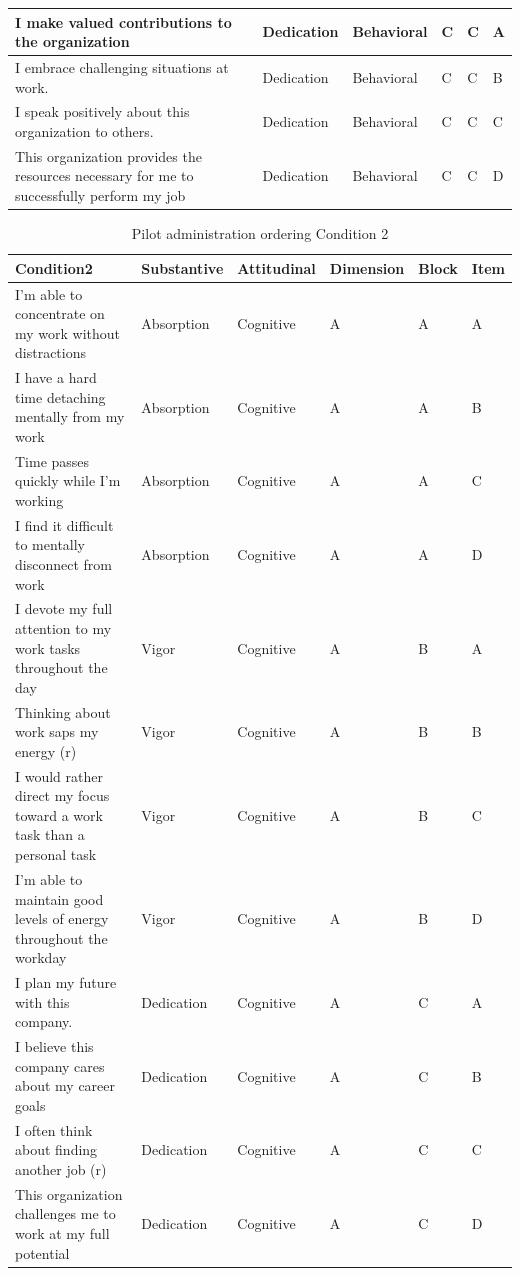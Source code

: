 \documentclass[
]{book}
\begin{document}
\begin{table}
\begin{tabular}[t]{l|l|l|l|l|l}
\hline
I make valued contributions to the organization & Dedication & Behavioral & C & C & A\\
\hline
I embrace challenging situations at work. & Dedication & Behavioral & C & C & B\\
\hline
I speak positively about this organization to others. & Dedication & Behavioral & C & C & C\\
\hline
This organization provides the resources necessary for me to successfully perform my job & Dedication & Behavioral & C & C & D\\
\hline
\end{tabular}
\end{table}

\begin{table}

\caption{\label{tab:cond2}Pilot administration ordering Condition 2}
\centering
\begin{tabular}[t]{l|l|l|l|l|l}
\hline
Condition2 & Substantive & Attitudinal & Dimension & Block & Item\\
\hline
I’m able to concentrate on my work without distractions & Absorption & Cognitive & A & A & A\\
\hline
I have a hard time detaching mentally from my work & Absorption & Cognitive & A & A & B\\
\hline
Time passes quickly while I’m working & Absorption & Cognitive & A & A & C\\
\hline
I find it difficult to mentally disconnect from work & Absorption & Cognitive & A & A & D\\
\hline
I devote my full attention to my work tasks throughout the day & Vigor & Cognitive & A & B & A\\
\hline
Thinking about work saps my energy (r) & Vigor & Cognitive & A & B & B\\
\hline
I would rather direct my focus toward a work task than a personal task & Vigor & Cognitive & A & B & C\\
\hline
I’m able to maintain good levels of energy throughout the workday & Vigor & Cognitive & A & B & D\\
\hline
I plan my future with this company. & Dedication & Cognitive & A & C & A\\
\hline
I believe this company cares about my career goals & Dedication & Cognitive & A & C & B\\
\hline
I often think about finding another job (r) & Dedication & Cognitive & A & C & C\\
\hline
This organization challenges me to work at my full potential & Dedication & Cognitive & A & C & D\\

\end{tabular}
\end{table}
\end{document}
